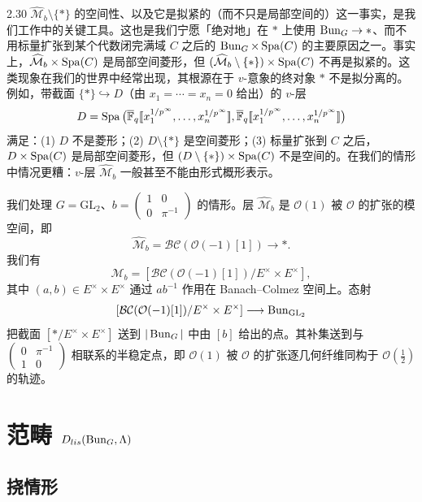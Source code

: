 \begin{rem}{2.30}
$\widehat{\mathcal M}_b\setminus\{*\}$ 的空间性、以及它是拟紧的（而不只是局部空间的）这一事实，是我们工作中的关键工具。这也是我们宁愿「绝对地」在 $*$ 上使用 $\operatorname{Bun}_G\to*$、而不用标量扩张到某个代数闭完满域 $C$ 之后的 $\operatorname{Bun}_G\times\operatorname{Spa}(C)$ 的主要原因之一。事实上，$\widehat{\mathcal M}_b\times\operatorname{Spa}(C)$ 是局部空间菱形，但 $(\widehat{\mathcal M}_b\setminus\{*\})\times\operatorname{Spa}(C)$ 不再是拟紧的。这类现象在我们的世界中经常出现，其根源在于 $v$-意象的终对象 $*$ 不是拟分离的。例如，带截面 $\{*\}\hookrightarrow D$（由 $x_1=\cdots=x_n=0$ 给出）的 $v$-层
\[
D=\operatorname{Spa}\big(\overline{\mathbb F}_q[\![x_1^{1/p^\infty},\dots,x_n^{1/p^\infty}]\!],\overline{\mathbb F}_q[\![x_1^{1/p^\infty},\dots,x_n^{1/p^\infty}]\!]\big)
\]
满足：(1) $D$ 不是菱形；(2) $D\setminus\{*\}$ 是空间菱形；(3) 标量扩张到 $C$ 之后，$D\times\operatorname{Spa}(C)$ 是局部空间菱形，但 $(D\setminus\{*\})\times\operatorname{Spa}(C)$ 不是空间的。在我们的情形中情况更糟：$v$-层 $\widehat{\mathcal M}_b$ 一般甚至不能由形式概形表示。\label{rem:a3-2-30}
\end{rem}

我们处理 $G=\mathrm{GL}_2$、$b=\begin{pmatrix}1&0\\0&\pi^{-1}\end{pmatrix}$ 的情形。层 $\widehat{\mathcal M}_b$ 是 $\mathcal O(1)$ 被 $\mathcal O$ 的扩张的模空间，即
\[
\widehat{\mathcal M}_b=\mathcal{BC}(\mathcal O(-1)[1])\longrightarrow *.
\]
我们有
\[
\mathcal M_b=[\mathcal{BC}(\mathcal O(-1)[1])/E^\times\times E^\times],
\]
其中 $(a,b)\in E^\times\times E^\times$ 通过 $ab^{-1}$ 作用在 Banach--Colmez 空间上。态射
\[
[\mathcal{BC}(\mathcal O(-1)[1])/E^\times\times E^\times]\longrightarrow\operatorname{Bun}_{\mathrm{GL}_2}
\]
把截面 $[*/E^\times\times E^\times]$ 送到 $|\operatorname{Bun}_G|$ 中由 $[b]$ 给出的点。其补集送到与 $\begin{pmatrix}0&\pi^{-1}\\1&0\end{pmatrix}$ 相联系的半稳定点，即 $\mathcal O(1)$ 被 $\mathcal O$ 的扩张逐几何纤维同构于 $\mathcal O(\frac12)$ 的轨迹。

\section{范畴 $D_{lis}(\operatorname{Bun}_G,\Lambda)$}

\subsection{挠情形}

